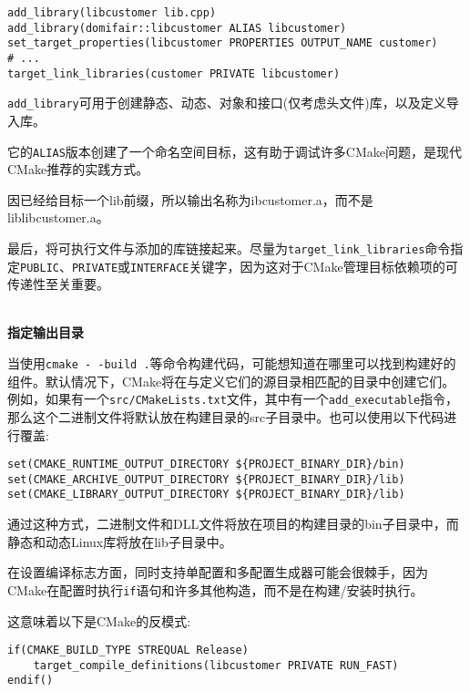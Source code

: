 \begin{lstlisting}[style=styleCMake]
add_library(libcustomer lib.cpp)
add_library(domifair::libcustomer ALIAS libcustomer)
set_target_properties(libcustomer PROPERTIES OUTPUT_NAME customer)
# ...
target_link_libraries(customer PRIVATE libcustomer)
\end{lstlisting}

\texttt{add\_library}可用于创建静态、动态、对象和接口(仅考虑头文件)库，以及定义导入库。

它的\texttt{ALIAS}版本创建了一个命名空间目标，这有助于调试许多CMake问题，是现代CMake推荐的实践方式。

因已经给目标一个lib前缀，所以输出名称为ibcustomer.a，而不是liblibcustomer.a。

最后，将可执行文件与添加的库链接起来。尽量为\texttt{target\_link\_libraries}命令指定\texttt{PUBLIC}、\texttt{PRIVATE}或\texttt{INTERFACE}关键字，因为这对于CMake管理目标依赖项的可传递性至关重要。

\hspace*{\fill} \\ %
\noindent
\textbf{指定输出目录}

当使用\texttt{cmake -\,-build .}等命令构建代码，可能想知道在哪里可以找到构建好的组件。默认情况下，CMake将在与定义它们的源目录相匹配的目录中创建它们。例如，如果有一个\texttt{src/CMakeLists.txt}文件，其中有一个\texttt{add\_executable}指令，那么这个二进制文件将默认放在构建目录的src子目录中。也可以使用以下代码进行覆盖:

\begin{lstlisting}[style=styleCMake]
set(CMAKE_RUNTIME_OUTPUT_DIRECTORY ${PROJECT_BINARY_DIR}/bin)
set(CMAKE_ARCHIVE_OUTPUT_DIRECTORY ${PROJECT_BINARY_DIR}/lib)
set(CMAKE_LIBRARY_OUTPUT_DIRECTORY ${PROJECT_BINARY_DIR}/lib)
\end{lstlisting}

通过这种方式，二进制文件和DLL文件将放在项目的构建目录的bin子目录中，而静态和动态Linux库将放在lib子目录中。


在设置编译标志方面，同时支持单配置和多配置生成器可能会很棘手，因为CMake在配置时执行\texttt{if}语句和许多其他构造，而不是在构建/安装时执行。

这意味着以下是CMake的反模式:

\begin{lstlisting}[style=styleCMake]
if(CMAKE_BUILD_TYPE STREQUAL Release)
	target_compile_definitions(libcustomer PRIVATE RUN_FAST)
endif()
\end{lstlisting}

